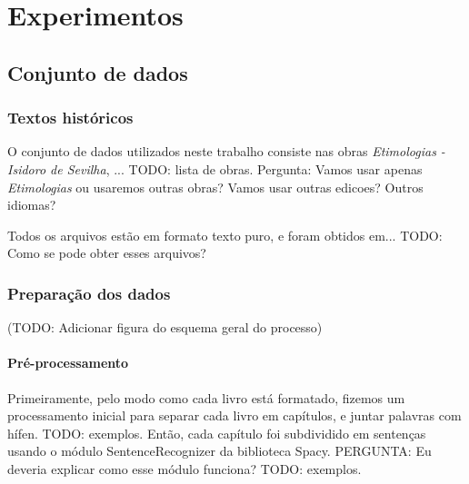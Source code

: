 
\chapter{Experimentos}

\section{Conjunto de dados}
\subsection{Textos históricos}
O conjunto de dados utilizados neste trabalho consiste nas obras \textit{Etimologias - Isidoro de Sevilha}, ... TODO: lista de obras. Pergunta: Vamos usar apenas \textit{Etimologias} ou usaremos outras obras? Vamos usar outras edicoes? Outros idiomas?

Todos os arquivos estão em formato texto puro, e foram obtidos em... TODO: Como se pode obter esses arquivos?

\subsection{Preparação dos dados}
(TODO: Adicionar figura do esquema geral do processo)
\subsubsection{Pré-processamento}
Primeiramente, pelo modo como cada livro está formatado, fizemos um processamento inicial para separar cada livro em capítulos, e juntar palavras com hífen. TODO: exemplos.
Então, cada capítulo foi subdividido em sentenças usando o módulo SentenceRecognizer da biblioteca Spacy. PERGUNTA: Eu deveria explicar como esse módulo funciona? TODO: exemplos.

